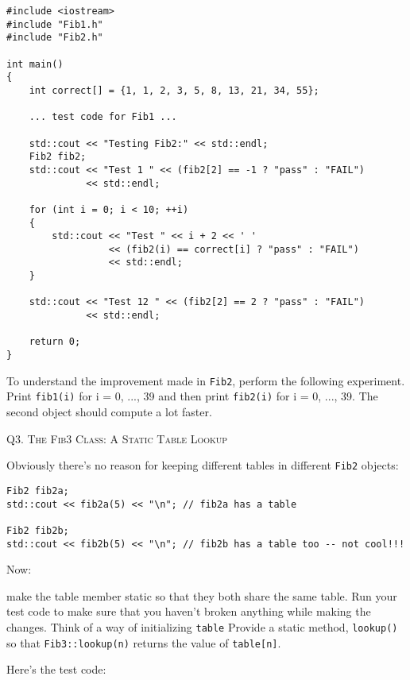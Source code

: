 \begin{Verbatim}[frame=single]
#include <iostream>
#include "Fib1.h"
#include "Fib2.h"

int main()
{
    int correct[] = {1, 1, 2, 3, 5, 8, 13, 21, 34, 55};

    ... test code for Fib1 ...

    std::cout << "Testing Fib2:" << std::endl;
    Fib2 fib2;
    std::cout << "Test 1 " << (fib2[2] == -1 ? "pass" : "FAIL")
              << std::endl;

    for (int i = 0; i < 10; ++i)
    {
        std::cout << "Test " << i + 2 << ' '
                  << (fib2(i) == correct[i] ? "pass" : "FAIL")
                  << std::endl;
    }

    std::cout << "Test 12 " << (fib2[2] == 2 ? "pass" : "FAIL")
              << std::endl;

    return 0;
}
\end{Verbatim}

To understand the improvement made in \texttt{Fib2}, perform the following experiment. Print \verb!fib1(i)! for i
= 0, ..., 39 and then print \verb!fib2(i)! for i = 0, ..., 39. The second object should compute a lot faster.



\newpage
Q3.
\textsc{The Fib3 Class: A Static Table Lookup}

Obviously there's no reason for keeping different tables in different \texttt{Fib2} objects:
\begin{Verbatim}[frame=single]
Fib2 fib2a;
std::cout << fib2a(5) << "\n"; // fib2a has a table

Fib2 fib2b;
std::cout << fib2b(5) << "\n"; // fib2b has a table too -- not cool!!!
\end{Verbatim}

Now:
\begin{tightlist}
  \li make the table member static so that they both share the same table. Run your test code to
  make sure that you haven't broken anything while making the changes. Think of a way of
  initializing \verb!table!
  \li Provide a static method, \texttt{lookup()} so that \texttt{Fib3::lookup(n)} returns the value of
  \verb!table[n]!.
\end{tightlist}

Here's the test code:

